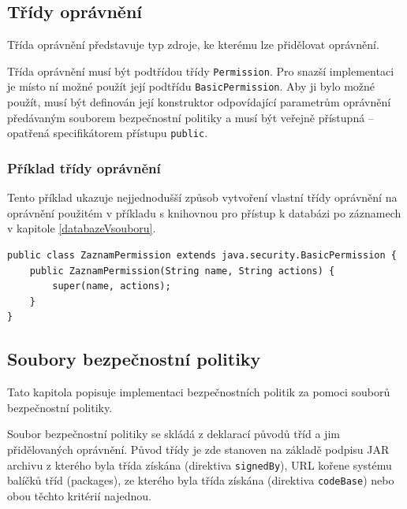 \subsection{Třídy oprávnění}

Třída oprávnění představuje typ zdroje, ke kterému lze přidělovat oprávnění.

Třída oprávnění musí být podtřídou třídy {\tt Permission}. Pro snazší implementaci je místo ní možné použít její podtřídu {\tt BasicPermission}.
Aby ji bylo možné použít, musí být definován její konstruktor odpovídající parametrům oprávnění předávaným souborem bezpečnostní politiky a musí být veřejně přístupná -- opatřená specifikátorem přístupu {\tt public}.

\subsubsection{Příklad třídy oprávnění}

Tento příklad ukazuje nejjednodušší způsob vytvoření vlastní třídy oprávnění na oprávnění použitém v příkladu s knihovnou pro přístup k databázi po záznamech v kapitole \ref{databazeVsouboru}.

\begin{verbatim}
public class ZaznamPermission extends java.security.BasicPermission {
    public ZaznamPermission(String name, String actions) {
        super(name, actions);
    }
}
\end{verbatim}

\subsection{Soubory bezpečnostní politiky}

Tato kapitola popisuje implementaci bezpečnostních politik za pomoci souborů bezpečnostní politiky.

Soubor bezpečnostní politiky se skládá z deklarací původů tříd a jim přidělovaných oprávnění.
Původ třídy je zde stanoven na základě podpisu JAR archivu z kterého byla třída získána (direktiva {\tt signedBy}), URL kořene systému balíčků tříd (packages), ze kterého byla třída získána (direktiva {\tt codeBase}) nebo obou těchto kritérií najednou. \cite[5.3.1]{oaks}


